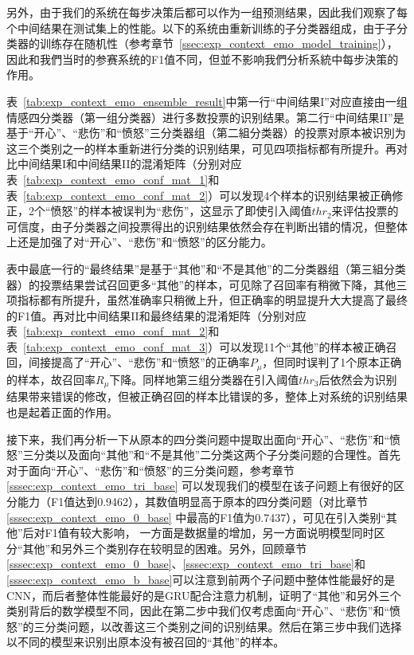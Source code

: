 另外，由于我们的系统在每步决策后都可以作为一组预测结果，因此我们观察了每个中间结果在测试集上的性能。以下的系统由重新训练的子分类器组成，由于子分类器的训练存在随机性（参考章节~\ref{ssec:exp_context_emo_model_training}），因此和我們当时的参赛系统的F1值不同，但並不影响我們分析系統中每步決策的作用。

表~\ref{tab:exp_context_emo_ensemble_result}中第一行“中间结果I”对应直接由一组情感四分类器（第一组分类器）进行多数投票的识别结果。第二行“中间结果II”是基于“开心”、“悲伤”和“愤怒”三分类器组（第二組分类器）的投票对原本被识別为这三个类别之一的样本重新进行分类的识别结果，可见四项指标都有所提升。再对比中间结果I和中间结果II的混淆矩阵（分别对应表~\ref{tab:exp_context_emo_conf_mat_1}和表~\ref{tab:exp_context_emo_conf_mat_2}）可以发现4个样本的识别结果被正确修正，2个“愤怒”的样本被误判为“悲伤”，这显示了即使引入阈值$thr_2$来评估投票的可信度，由子分类器之间投票得出的识别结果依然会存在判断出错的情况，但整体上还是加强了对“开心”、“悲伤”和“愤怒”的区分能力。

表中最底一行的“最终结果”是基于“其他”和“不是其他”的二分类器组（第三組分类器）的投票结果尝试召回更多“其他”的样本，可见除了召回率有稍微下降，其他三项指标都有所提升，虽然准确率只稍微上升，但正确率的明显提升大大提高了最终的F1值。再对比中间结果II和最终结果的混淆矩阵（分别对应表~\ref{tab:exp_context_emo_conf_mat_2}和表~\ref{tab:exp_context_emo_conf_mat_3}）可以发现11个“其他”的样本被正确召回，间接提高了“开心”、“悲伤”和“愤怒”的正确率$P_\mu$，但同时误判了1个原本正确的样本，故召回率$R_\mu$下降。同样地第三组分类器在引入阈值$thr_3$后依然会为识别结果带来错误的修改，但被正确召回的样本比错误的多，整体上对系统的识别结果也是起着正面的作用。

接下来，我们再分析一下从原本的四分类问题中提取出面向“开心”、“悲伤”和“愤怒”三分类以及面向“其他”和“不是其他”二分类这两个子分类问题的合理性。首先对于面向“开心”、“悲伤”和“愤怒”的三分类问题，参考章节\ref{sssec:exp_context_emo_tri_base}
可以发现我们的模型在该子问题上有很好的区分能力（F1值达到0.9462），其数值明显高于原本的四分类问题（对比章节\ref{sssec:exp_context_emo_0_base}
中最高的F1值为0.7437），可见在引入类别“其他”后对F1值有较大影响，
一方面是数据量的增加，另一方面说明模型同时区分“其他”和另外三个类别存在较明显的困难。另外，回顾章节\ref{sssec:exp_context_emo_0_base}、\ref{sssec:exp_context_emo_tri_base}和\ref{sssec:exp_context_emo_b_base}可以注意到前两个子问题中整体性能最好的是CNN，而后者整体性能最好的是GRU配合注意力机制，证明了“其他”和另外三个类别背后的数学模型不同，因此在第二步中我们仅考虑面向“开心”、“悲伤”和“愤怒”的三分类问题，以改善这三个类别之间的识别结果。然后在第三步中我们选择以不同的模型来识别出原本没有被召回的“其他”的样本。

